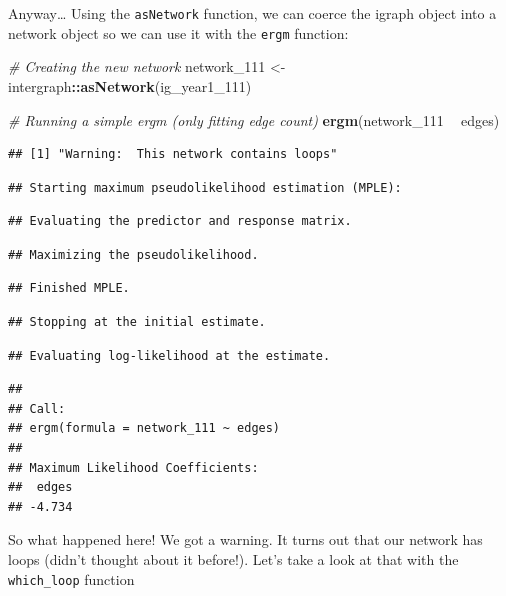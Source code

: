 \documentclass[]{book}
\newenvironment{Shaded}{\begin{snugshade}}{\end{snugshade}}
\newcommand{\CommentTok}[1]{\textcolor[rgb]{0.56,0.35,0.01}{\textit{#1}}}
\newcommand{\DecValTok}[1]{\textcolor[rgb]{0.00,0.00,0.81}{#1}}
\newcommand{\KeywordTok}[1]{\textcolor[rgb]{0.13,0.29,0.53}{\textbf{#1}}}
\newcommand{\NormalTok}[1]{#1}
\newcommand{\OperatorTok}[1]{\textcolor[rgb]{0.81,0.36,0.00}{\textbf{#1}}}
\newcommand{\StringTok}[1]{\textcolor[rgb]{0.31,0.60,0.02}{#1}}
\begin{document}
Anyway\ldots{} Using the \texttt{asNetwork} function, we can coerce the igraph object into a network object so we can use it with the \texttt{ergm} function:

\begin{Shaded}
\begin{Highlighting}[]
\CommentTok{# Creating the new network}
\NormalTok{network_}\DecValTok{111}\NormalTok{ <-}\StringTok{ }\NormalTok{intergraph}\OperatorTok{::}\KeywordTok{asNetwork}\NormalTok{(ig_year1_}\DecValTok{111}\NormalTok{)}

\CommentTok{# Running a simple ergm (only fitting edge count)}
\KeywordTok{ergm}\NormalTok{(network_}\DecValTok{111} \OperatorTok{~}\StringTok{ }\NormalTok{edges)}
\end{Highlighting}
\end{Shaded}

\begin{verbatim}
## [1] "Warning:  This network contains loops"
\end{verbatim}

\begin{verbatim}
## Starting maximum pseudolikelihood estimation (MPLE):
\end{verbatim}

\begin{verbatim}
## Evaluating the predictor and response matrix.
\end{verbatim}

\begin{verbatim}
## Maximizing the pseudolikelihood.
\end{verbatim}

\begin{verbatim}
## Finished MPLE.
\end{verbatim}

\begin{verbatim}
## Stopping at the initial estimate.
\end{verbatim}

\begin{verbatim}
## Evaluating log-likelihood at the estimate.
\end{verbatim}

\begin{verbatim}
## 
## Call:
## ergm(formula = network_111 ~ edges)
## 
## Maximum Likelihood Coefficients:
##  edges  
## -4.734
\end{verbatim}

So what happened here! We got a warning. It turns out that our network has loops (didn't thought about it before!). Let's take a look at that with the \texttt{which\_loop} function
\end{document}
